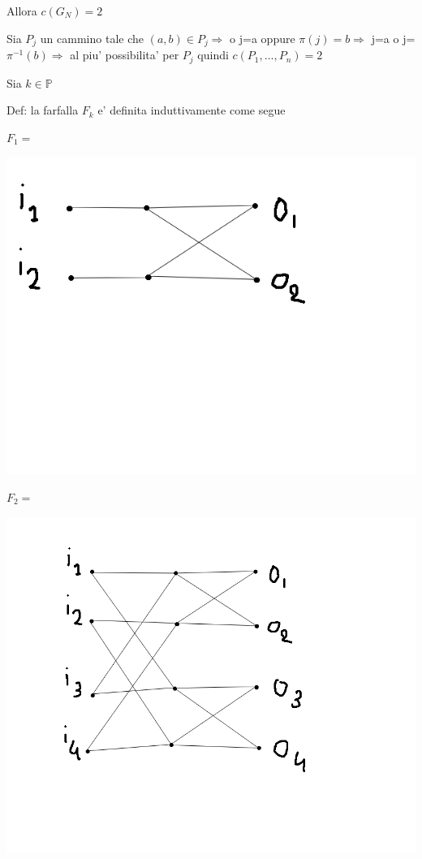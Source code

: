 \documentclass{article}
\begin{document}
        \begin{flushleft}
          Allora $c(G_N)=2$
        \end{flushleft}
        \begin{flushleft}
          Sia $P_j$ un cammino tale che $(a,b)\in P_j \Rightarrow$ o j=a oppure $\pi(j)=b \Rightarrow$ j=a o j=$\pi^{-1}(b) \Rightarrow$ al piu' possibilita' per $P_j$ quindi $c(P_1,...,P_n)=2$
        \end{flushleft}
        Sia $k\in \mathbb{P}$
        \begin{flushleft}
          Def: la farfalla $F_k$ e' definita induttivamente come segue
        \end{flushleft}
        \begin{flushleft}
          $F_1=$
        \end{flushleft}
        \includegraphics[bb=0 0 200 200]{pic/f1farfalla.png}
        \begin{flushleft}
          $F_2=$
        \end{flushleft}
        \includegraphics[bb=0 0 200 200]{pic/f2farfalla.png}
\end{document}
